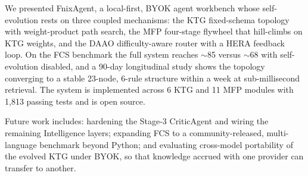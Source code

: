 \documentclass[sigconf]{acmart}
\begin{document}
We presented FnixAgent, a local-first, BYOK agent workbench whose self-evolution rests on three coupled mechanisms: the KTG fixed-schema topology with weight-product path search, the MFP four-stage flywheel that hill-climbs on KTG weights, and the DAAO difficulty-aware router with a HERA feedback loop. On the FCS benchmark the full system reaches $\sim$85 versus $\sim$68 with self-evolution disabled, and a 90-day longitudinal study shows the topology converging to a stable 23-node, 6-rule structure within a week at sub-millisecond retrieval. The system is implemented across 6 KTG and 11 MFP modules with 1{,}813 passing tests and is open source.

Future work includes: hardening the Stage-3 CriticAgent and wiring the remaining Intelligence layers; expanding FCS to a community-released, multi-language benchmark beyond Python; and evaluating cross-model portability of the evolved KTG under BYOK, so that knowledge accrued with one provider can transfer to another.



\end{document}
